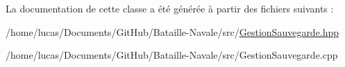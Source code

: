 La documentation de cette classe a été générée à partir des fichiers suivants \+:\begin{DoxyCompactItemize}
\item 
/home/lucas/\+Documents/\+Git\+Hub/\+Bataille-\/\+Navale/src/\hyperlink{_gestion_sauvegarde_8hpp}{Gestion\+Sauvegarde.\+hpp}\item 
/home/lucas/\+Documents/\+Git\+Hub/\+Bataille-\/\+Navale/src/Gestion\+Sauvegarde.\+cpp\end{DoxyCompactItemize}
